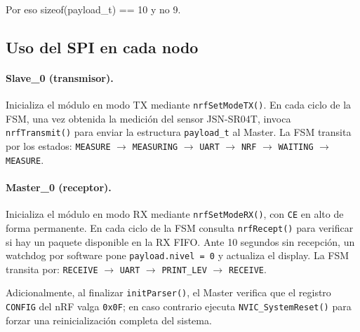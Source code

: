 \documentclass[12pt,a4paper]{article}
\begin{document}
                                                                                
  Por eso sizeof(payload\_t) == 10 y no 9. 
  
  \subsection{Uso del SPI en cada nodo}                                                                                                                                                                                                                       
  
  \paragraph{Slave\_0 (transmisor).}                                                                                                                                                                                                                          
  Inicializa el módulo en modo TX mediante \texttt{nrfSetModeTX()}. En cada ciclo de la FSM, una vez obtenida la medición del sensor JSN-SR04T, invoca \texttt{nrfTransmit()} para enviar la estructura \texttt{payload\_t} al Master. La FSM transita por los
   estados: \texttt{MEASURE} $\to$ \texttt{MEASURING} $\to$ \texttt{UART} $\to$ \texttt{NRF} $\to$ \texttt{WAITING} $\to$ \texttt{MEASURE}.                                                                                                                   
  
  \paragraph{Master\_0 (receptor).}                                                                                                                                                                                                                           
  Inicializa el módulo en modo RX mediante \texttt{nrfSetModeRX()}, con \texttt{CE} en alto de forma permanente. En cada ciclo de la FSM consulta \texttt{nrfRecept()} para verificar si hay un paquete disponible en la RX FIFO. Ante 10 segundos sin
  recepción, un watchdog por software pone \texttt{payload.nivel = 0} y actualiza el display. La FSM transita por: \texttt{RECEIVE} $\to$ \texttt{UART} $\to$ \texttt{PRINT\_LEV} $\to$ \texttt{RECEIVE}.                                                     
  
  Adicionalmente, al finalizar \texttt{initParser()}, el Master verifica que el registro \texttt{CONFIG} del nRF valga \texttt{0x0F}; en caso contrario ejecuta \texttt{NVIC\_SystemReset()} para forzar una reinicialización completa del sistema.           
\end{document}
